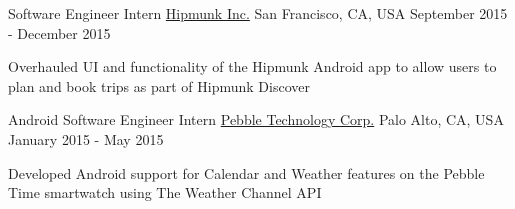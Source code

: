 \begin{center}
  \vspace{-2.7mm}
  \cventry
    {Software Engineer Intern}
    {\href{http://hipmunk.com/mobile}{Hipmunk Inc.}}
    {San Francisco, CA, USA}
    {September 2015 - December 2015}
    {
      \begin{cvitems}
        \item {Overhauled UI and functionality of the Hipmunk Android app to allow users to plan and book trips as part of Hipmunk Discover}
      \end{cvitems}
    }
\end{center}
\begin{center}
  \vspace{-2.7mm}
  \cventry
    {Android Software Engineer Intern}
    {\href{http://pebble.com/apps}{Pebble Technology Corp.}}
    {Palo Alto, CA, USA}
    {January 2015 - May 2015}
    {
      \begin{cvitems}
        \item {Developed Android support for Calendar and Weather features on the Pebble Time smartwatch using The Weather Channel API}
      \end{cvitems}
    }
\end{center}
